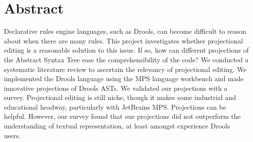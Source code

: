 \chapter*{Abstract}

Declarative rules engine languages, such as Drools, can become difficult to reason about when there are many rules.
This project investigates whether projectional editing is a reasonable solution to this issue.
If so, how can different projections of the Abstract Syntax Tree ease the comprehensibility of the code?
We conducted a systematic literature review to ascertain the relevancy of projectional editing.
We implemented the Drools language using the MPS language workbench and made innovative projections of Drools ASTs.
We validated our projections with a survey. 
Projectional editing is still niche, though it makes some industrial and educational headway, particularly with JetBrains MPS. 
Projections can be helpful. 
However, our survey found that our projections did not outperform the understanding of textual representation, at least amongst experience Drools users. 


